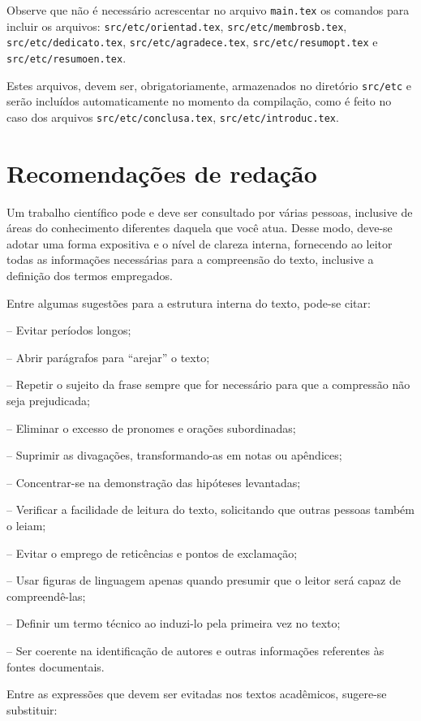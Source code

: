 Observe que não é necessário acrescentar no arquivo \texttt{main.tex}
os comandos para incluir os arquivos: \texttt{src/etc/orientad.tex}, \texttt{src/etc/membrosb.tex},
\texttt{src/etc/dedicato.tex}, \texttt{src/etc/agradece.tex}, \texttt{src/etc/resumopt.tex} e \texttt{src/etc/resumoen.tex}.

Estes arquivos, devem ser, obrigatoriamente, armazenados no diretório \texttt{src/etc} e serão incluídos automaticamente no momento da compilação, como é feito no caso dos arquivos \texttt{src/etc/conclusa.tex}, \texttt{src/etc/introduc.tex}.

\section{Recomendações de redação}
Um trabalho científico pode e deve ser consultado por várias pessoas, inclusive de áreas do conhecimento diferentes daquela que você atua. Desse modo, deve-se adotar uma forma expositiva e o nível de clareza interna, fornecendo ao leitor todas as informações necessárias para a compreensão do texto, inclusive a definição dos termos empregados.

Entre algumas sugestões para a estrutura interna do texto, pode-se citar:

– Evitar períodos longos;

– Abrir parágrafos para “arejar” o texto;

– Repetir o sujeito da frase sempre que for necessário para que a compressão não seja prejudicada;

– Eliminar o excesso de pronomes e orações subordinadas;

– Suprimir as divagações, transformando-as em notas ou apêndices;

– Concentrar-se na demonstração das hipóteses levantadas;

– Verificar a facilidade de leitura do texto, solicitando que outras pessoas também o leiam;

– Evitar o emprego de reticências e pontos de exclamação;

– Usar figuras de linguagem apenas quando presumir que o leitor será capaz de compreendê-las;

– Definir um termo técnico ao induzi-lo pela primeira vez no texto;

– Ser coerente na identificação de autores e outras informações referentes às fontes documentais.

Entre as expressões que devem ser evitadas nos textos acadêmicos, sugere-se substituir:

